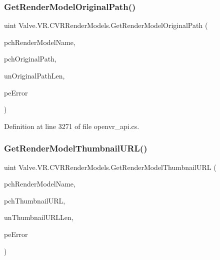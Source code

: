 \mbox{\label{class_valve_1_1_v_r_1_1_c_v_r_render_models_a5a20531712ff8070bb1bbc02ae7b36fd}} 
\subsubsection{\texorpdfstring{GetRenderModelOriginalPath()}{GetRenderModelOriginalPath()}}
{\footnotesize\ttfamily uint Valve.\+V\+R.\+C\+V\+R\+Render\+Models.\+Get\+Render\+Model\+Original\+Path (\begin{DoxyParamCaption}\item[{string}]{pch\+Render\+Model\+Name,  }\item[{System.\+Text.\+String\+Builder}]{pch\+Original\+Path,  }\item[{uint}]{un\+Original\+Path\+Len,  }\item[{ref \mbox{\hyperlink{namespace_valve_1_1_v_r_ac95dda09bbb588fd83a8ac0ba3c82266}{E\+V\+R\+Render\+Model\+Error}}}]{pe\+Error }\end{DoxyParamCaption})}



Definition at line 3271 of file openvr\+\_\+api.\+cs.

\mbox{\label{class_valve_1_1_v_r_1_1_c_v_r_render_models_a3b4303443fb1a0ab9b5688f6cf1811b8}} 
\subsubsection{\texorpdfstring{GetRenderModelThumbnailURL()}{GetRenderModelThumbnailURL()}}
{\footnotesize\ttfamily uint Valve.\+V\+R.\+C\+V\+R\+Render\+Models.\+Get\+Render\+Model\+Thumbnail\+U\+RL (\begin{DoxyParamCaption}\item[{string}]{pch\+Render\+Model\+Name,  }\item[{System.\+Text.\+String\+Builder}]{pch\+Thumbnail\+U\+RL,  }\item[{uint}]{un\+Thumbnail\+U\+R\+L\+Len,  }\item[{ref \mbox{\hyperlink{namespace_valve_1_1_v_r_ac95dda09bbb588fd83a8ac0ba3c82266}{E\+V\+R\+Render\+Model\+Error}}}]{pe\+Error }\end{DoxyParamCaption})}



